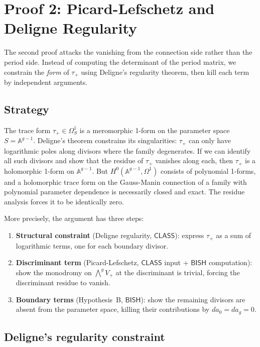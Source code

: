 \documentclass[11pt]{article}
\theoremstyle{plain}
\theoremstyle{definition}
\theoremstyle{remark}
\newcommand{\BISH}{\mathsf{BISH}}
\newcommand{\CLASS}{\mathsf{CLASS}}
\begin{document}
\section{Proof 2: Picard-Lefschetz and Deligne Regularity}\label{sec:proof2}

The second proof attacks the vanishing from the connection side rather
than the period side.  Instead of computing the determinant of the period
matrix, we constrain the \emph{form} of $\tau_+$ using Deligne's regularity
theorem, then kill each term by independent arguments.

\subsection{Strategy}

The trace form $\tau_+ \in \Omega^1_S$ is a meromorphic 1-form on the
parameter space $S = \mathbb{A}^{g-1}$.  Deligne's theorem constrains its
singularities: $\tau_+$ can only have logarithmic poles along divisors where
the family degenerates.  If we can identify all such divisors and show that
the residue of $\tau_+$ vanishes along each, then $\tau_+$ is a holomorphic
1-form on $\mathbb{A}^{g-1}$.  But $H^0(\mathbb{A}^{g-1}, \Omega^1)$ consists
of polynomial 1-forms, and a holomorphic trace form on the Gauss-Manin connection
of a family with polynomial parameter dependence is necessarily closed and
exact.  The residue analysis forces it to be identically zero.

More precisely, the argument has three steps:
\begin{enumerate}[label=\textbf{(\arabic*)}]
\item \textbf{Structural constraint} (Deligne regularity, $\CLASS$): express
  $\tau_+$ as a sum of logarithmic terms, one for each boundary divisor.
\item \textbf{Discriminant term} (Picard-Lefschetz, $\CLASS$ input + $\BISH$
  computation): show the monodromy on $\bigwedge^g V_+$ at the discriminant
  is trivial, forcing the discriminant residue to vanish.
\item \textbf{Boundary terms} (Hypothesis~B, $\BISH$): show the remaining
  divisors are absent from the parameter space, killing their contributions
  by $da_0 = da_g = 0$.
\end{enumerate}

\subsection{Deligne's regularity constraint}\label{subsec:deligne-proof}
\end{document}
